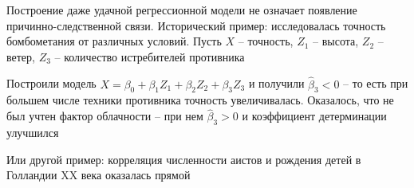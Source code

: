 Построение даже удачной регрессионной модели не означает появление причинно-следственной связи. Исторический пример: исследовалась точность бомбометания от различных условий. Пусть $X$ -- точность, $Z_1$ -- высота, $Z_2$ -- ветер, $Z_3$ -- количество истребителей противника

Построили модель $X = \beta_0 + \beta_1 Z_1 + \beta_2 Z_2 + \beta_3 Z_3$ и получили $\hat \beta_3 < 0$ -- то есть при большем числе техники противника точность увеличивалась. Оказалось, что не был учтен фактор облачности -- при нем $\hat \beta_3 > 0$ и коэффициент детерминации улучшился

Или другой пример: корреляция численности аистов и рождения детей в Голландии XX века оказалась прямой






